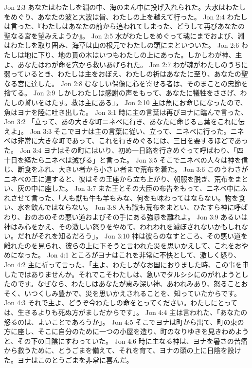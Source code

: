 Jon 2:3  あなたはわたしを淵の中、海のまん中に投げ入れられた。大水はわたしをめぐり、あなたの波と大波は皆、わたしの上を越えて行った。
Jon 2:4  わたしは言った、『わたしはあなたの前から追われてしまった、どうして再びあなたの聖なる宮を望みえようか』。
Jon 2:5  水がわたしをめぐって魂にまでおよび、淵はわたしを取り囲み、海草は山の根元でわたしの頭にまといついた。
Jon 2:6  わたしは地に下り、地の貫の木はいつもわたしの上にあった。しかしわが神、主よ、あなたはわが命を穴から救いあげられた。
Jon 2:7  わが魂がわたしのうちに弱っているとき、わたしは主をおぼえ、わたしの祈はあなたに至り、あなたの聖なる宮に達した。
Jon 2:8  むなしい偶像に心を寄せる者は、そのまことの忠節を捨てる。
Jon 2:9  しかしわたしは感謝の声をもって、あなたに犠牲をささげ、わたしの誓いをはたす。救は主にある」。
Jon 2:10  主は魚にお命じになったので、魚はヨナを陸に吐き出した。
Jon 3:1  時に主の言葉は再びヨナに臨んで言った、
Jon 3:2  「立って、あの大きな町ニネベに行き、あなたに命じる言葉をこれに伝えよ」。
Jon 3:3  そこでヨナは主の言葉に従い、立って、ニネベに行った。ニネベは非常に大きな町であって、これを行きめぐるには、三日を要するほどであった。
Jon 3:4  ヨナはその町にはいり、初め一日路を行きめぐって呼ばわり、「四十日を経たらニネベは滅びる」と言った。
Jon 3:5  そこでニネベの人々は神を信じ、断食をふれ、大きい者から小さい者まで荒布を着た。
Jon 3:6  このうわさがニネベの王に達すると、彼はその王座から立ち上がり、朝服を脱ぎ、荒布をまとい、灰の中に座した。
Jon 3:7  また王とその大臣の布告をもって、ニネベ中にふれさせて言った、「人も獣も牛も羊もみな、何をも味わってはならない。物を食い、水を飲んではならない。
Jon 3:8  人も獣も荒布をまとい、ひたすら神に呼ばわり、おのおのその悪い道およびその手にある強暴を離れよ。
Jon 3:9  あるいは神はみ心をかえ、その激しい怒りをやめて、われわれを滅ぼされないかもしれない。だれがそれを知るだろう」。
Jon 3:10  神は彼らのなすところ、その悪い道を離れたのを見られ、彼らの上に下そうと言われた災を思いかえして、これをおやめになった。
Jon 4:1  ところがヨナはこれを非常に不快として、激しく怒り、
Jon 4:2  主に祈って言った、「主よ、わたしがなお国におりました時、この事を申したではありませんか。それでこそわたしは、急いでタルシシにのがれようとしたのです。なぜなら、わたしはあなたが恵み深い神、あわれみあり、怒ることおそく、いつくしみ豊かで、災を思いかえされることを、知っていたからです。
Jon 4:3  それで主よ、どうぞ今わたしの命をとってください。わたしにとっては、生きるよりも死ぬ方がましだからです」。
Jon 4:4  主は言われた、「あなたの怒るのは、よいことであろうか」。
Jon 4:5  そこでヨナは町から出て、町の東の方に座し、そこに自分のために一つの小屋を造り、町のなりゆきを見きわめようと、その下の日陰にすわっていた。
Jon 4:6  時に主なる神は、ヨナを暑さの苦痛から救うために、とうごまを備えて、それを育て、ヨナの頭の上に日陰を設けた。ヨナはこのとうごまを非常に喜んだ。
